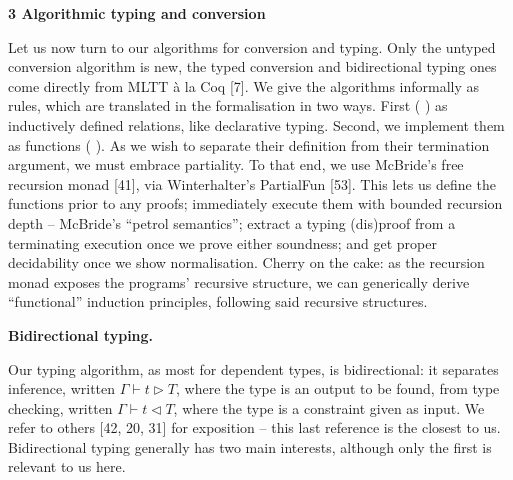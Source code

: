 

 
\par\medskip\noindent\textbf{3 Algorithmic typing and conversion}\par
 
 
Let us now turn to our algorithms for conversion and typing. Only the untyped conversion algorithm is new, the typed conversion and bidirectional typing ones come directly from MLTT à la Coq [7]. We give the algorithms informally as rules, which are translated in the formalisation in two ways. First ( ) as inductively defined relations, like declarative typing. Second, we implement them as functions ( ). As we wish to separate their definition from their termination argument, we must embrace partiality. To that end, we use McBride’s free recursion monad [41], via Winterhalter’s PartialFun [53]. This lets us define the functions prior to any proofs; immediately execute them with bounded recursion depth – McBride’s “petrol semantics”; extract a typing (dis)proof from a terminating execution once we prove either soundness; and get proper decidability once we show normalisation. Cherry on the cake: as the recursion monad exposes the programs’ recursive structure, we can generically derive “functional” induction principles, following said recursive structures.\par
 
 
 
\par\medskip\noindent\textbf{Bidirectional typing.}\par
 
 
Our typing algorithm, as most for dependent types, is bidirectional: it separates inference, written $\Gamma\vdash t\mathrel{\rhd}T$, where the type is an output to be found, from type checking, written $\Gamma\vdash t\operatorname{\mathrel{\lhd}}T$, where the type is a constraint given as input. We refer to others [42, 20, 31] for exposition – this last reference is the closest to us. Bidirectional typing generally has two main interests, although only the first is relevant to us here.\par
 
 
 
